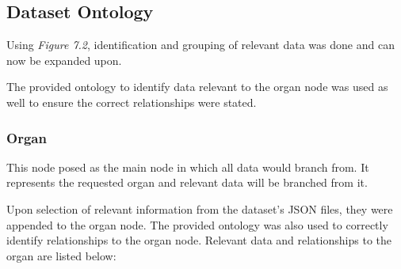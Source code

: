 \subsection{Dataset Ontology}
\hspace*{0.5cm} Using \textit{Figure 7.2}, identification and grouping of relevant data was done and can now be expanded upon. 

The provided ontology to identify data relevant to the organ node was used as well to ensure the correct relationships were stated.

\subsubsection{Organ}
\hspace*{0.5cm} This node posed as the main node in which all data would branch from. It represents the requested organ and relevant data will be branched from it. 

Upon selection of relevant information from the dataset's JSON files, they were appended to the organ node. The provided ontology was also used to correctly identify relationships to the organ node. Relevant data and relationships to the organ are listed below:

